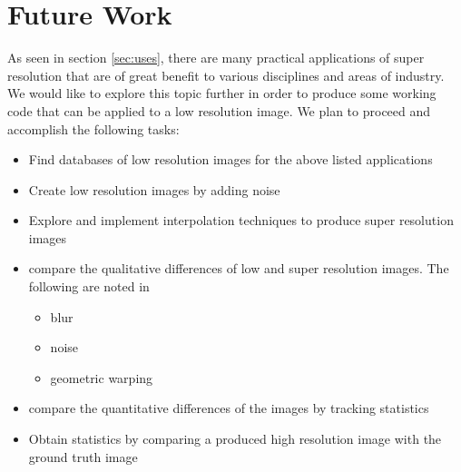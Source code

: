 \documentclass{article}
\begin{document}
\section{Future Work}
\label{sec:future}
As seen in section \ref{sec:uses}, there are many practical
applications of super resolution that are of great benefit to various
disciplines and areas of industry. We would like to explore this topic
further in order to produce some working code that can be applied to a low
resolution image. We plan to proceed and accomplish the following
tasks:
\begin{itemize}
\item Find databases of low resolution images for the
  above listed applications
  \item Create low resolution images by adding noise
  \item Explore and implement interpolation techniques to produce
    super resolution images
    \item compare the qualitative differences of low and super
      resolution images. The following are noted in \cite{CapelMulti}
      \begin{itemize}
      \item blur
      \item  noise
      \item geometric warping
        
        \end{itemize}
      \item compare the quantitative differences of the images by
        tracking statistics
        \item Obtain statistics by comparing a produced high resolution image with
        the ground truth image 
\end{itemize}


\newpage
\printbibliography
\end{document}
